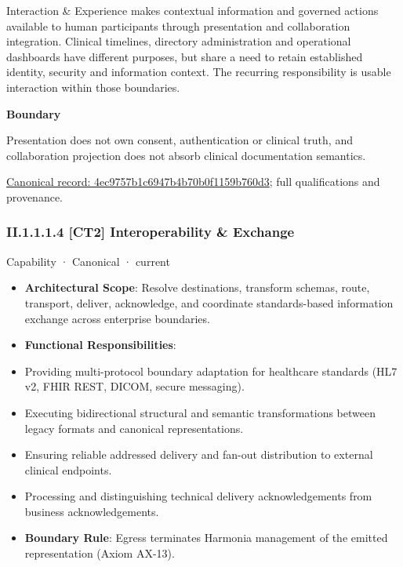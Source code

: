 Interaction \& Experience makes contextual information and governed actions available to human participants through presentation and collaboration integration. Clinical timelines, directory administration and operational dashboards have different purposes, but share a need to retain established identity, security and information context. The recurring responsibility is usable interaction within those boundaries.



\textbf{Boundary}



Presentation does not own consent, authentication or clinical truth, and collaboration projection does not absorb clinical documentation semantics.


{\footnotesize \href{../../../../continuum/strategy/capability/4ec9757b1c6947b4b70b0f1159b760d3.md}{Canonical record: 4ec9757b1c6947b4b70b0f1159b760d3}; full qualifications and provenance.}\par
\subsubsection*{II.1.1.1.4 [CT2] Interoperability \& Exchange}
\label{navigation:II.1.1.1.4}

\label{element:0f2e5222874949d8b0cce234941ecb20}
{\small Capability · Canonical · current}\par

\begin{itemize}


\item \textbf{Architectural Scope}: Resolve destinations, transform schemas, route, transport, deliver, acknowledge, and coordinate standards-based information exchange across enterprise boundaries.

\item \textbf{Functional Responsibilities}:

\item Providing multi-protocol boundary adaptation for healthcare standards (HL7 v2, FHIR REST, DICOM, secure messaging).

\item Executing bidirectional structural and semantic transformations between legacy formats and canonical representations.

\item Ensuring reliable addressed delivery and fan-out distribution to external clinical endpoints.

\item Processing and distinguishing technical delivery acknowledgements from business acknowledgements.

\item \textbf{Boundary Rule}: Egress terminates Harmonia management of the emitted representation (Axiom AX-13).

\end{itemize}


